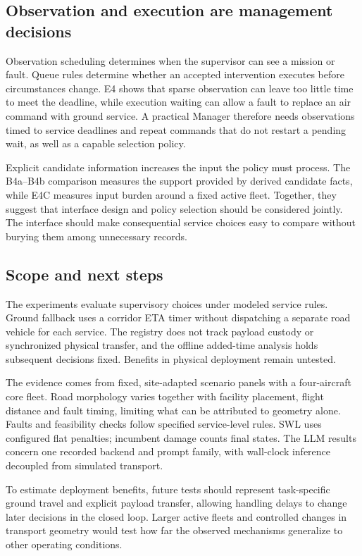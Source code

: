 \documentclass[]{interact}
\theoremstyle{plain}
\theoremstyle{definition}
\theoremstyle{remark}
\begin{document}
\subsection{Observation and execution are management decisions}

Observation scheduling determines when the supervisor can see a mission or fault. Queue rules determine whether an accepted intervention executes before circumstances change. E4 shows that sparse observation can leave too little time to meet the deadline, while execution waiting can allow a fault to replace an air command with ground service. A practical Manager therefore needs observations timed to service deadlines and repeat commands that do not restart a pending wait, as well as a capable selection policy.

Explicit candidate information increases the input the policy must process. The B4a--B4b comparison measures the support provided by derived candidate facts, while E4C measures input burden around a fixed active fleet. Together, they suggest that interface design and policy selection should be considered jointly. The interface should make consequential service choices easy to compare without burying them among unnecessary records.

\subsection{Scope and next steps}

The experiments evaluate supervisory choices under modeled service rules. Ground fallback uses a corridor ETA timer without dispatching a separate road vehicle for each service. The registry does not track payload custody or synchronized physical transfer, and the offline added-time analysis holds subsequent decisions fixed. Benefits in physical deployment remain untested.

The evidence comes from fixed, site-adapted scenario panels with a four-aircraft core fleet. Road morphology varies together with facility placement, flight distance and fault timing, limiting what can be attributed to geometry alone. Faults and feasibility checks follow specified service-level rules. SWL uses configured flat penalties; incumbent damage counts final states. The LLM results concern one recorded backend and prompt family, with wall-clock inference decoupled from simulated transport.

To estimate deployment benefits, future tests should represent task-specific ground travel and explicit payload transfer, allowing handling delays to change later decisions in the closed loop. Larger active fleets and controlled changes in transport geometry would test how far the observed mechanisms generalize to other operating conditions.
\end{document}
